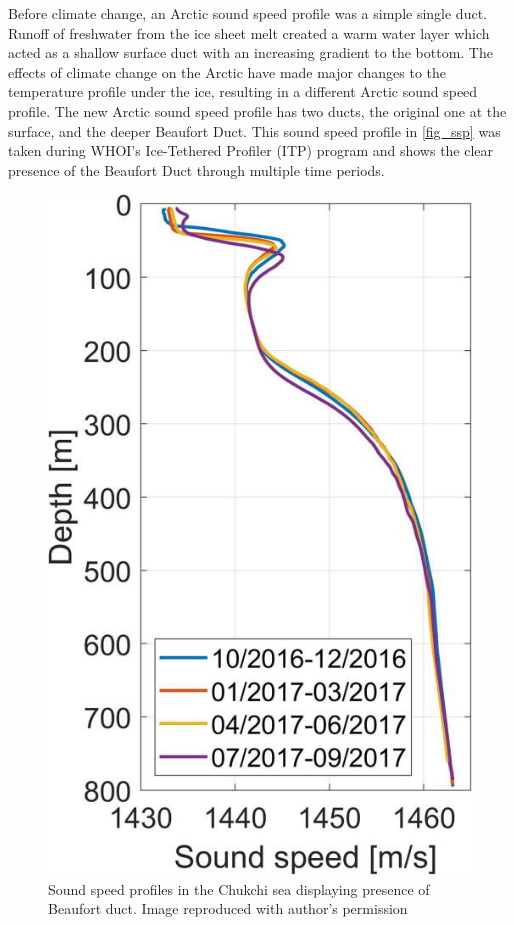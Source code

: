 Before climate change, an Arctic sound speed profile was a simple single duct. Runoff of freshwater from the ice sheet melt created a warm water layer which acted as a shallow surface duct with an increasing gradient to the bottom. The effects of climate change on the Arctic have made major changes to the temperature profile under the ice, resulting in a different Arctic sound speed profile. The new Arctic sound speed profile has two ducts, the original one at the surface, and the deeper Beaufort Duct. This sound speed profile in \autoref{fig_ssp} was taken during WHOI's Ice-Tethered Profiler (ITP) program \parencite{krishfield2008automated} and shows the clear presence of the Beaufort Duct through multiple time periods. \parencite{Bonnel2021} 

\begin{figure}[ht]
\centering
\includegraphics[scale=2]{Figures/ssp.jpeg}
\caption{Sound speed profiles in the Chukchi sea displaying presence of Beaufort duct. Image reproduced with author's permission \parencite{Bonnel2021}}
\label{fig_ssp}
\end{figure}


